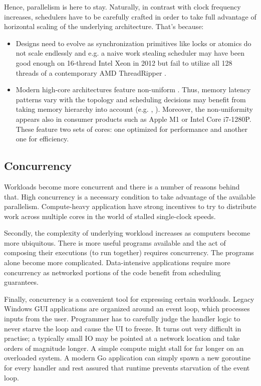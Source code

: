 \documentclass[12pt,a4paper,twoside]{report}
\begin{document}
Hence, parallelism is here to stay. Naturally, in contrast with clock frequency increases, schedulers have to be carefully crafted in order to take full advantage of horizontal scaling of the underlying architecture. That's because:
\begin{itemize}
    \item Designs need to evolve as synchronization primitives like locks or atomics do not scale endlessly and e.g. a naive work stealing scheduler may have been good enough on 16-thread Intel Xeon in 2012 but fail to utilize all 128 threads of a contemporary AMD ThreadRipper  \cite{Castello2016}. 
    \item Modern high-core architectures feature non-uniform . Thus, memory latency patterns vary with the topology and scheduling decisions may benefit from taking memory hierarchy into account (e.g. \cite{Drebes2016}, \cite{faverge:inria-00416502}). Moreover, the non-uniformity appears also in consumer products such as Apple M1 or Intel Core i7-1280P. These feature two sets of cores: one optimized for performance and another one for efficiency.
\end{itemize}

\subsection{Concurrency}
\label{section:intr_software_conc}
Workloads become more concurrent and there is a number of reasons behind that. High concurrency is a necessary condition to take advantage of the available parallelism. Compute-heavy application have strong incentives to try to distribute work across multiple cores in the world of stalled single-clock speeds. 

Secondly, the complexity of underlying workload increases as computers become more ubiquitous. There is more useful programs available and the act of composing their executions (to run together) requires concurrency. The programs alone become more complicated. Data-intensive applications \cite{Kleppmann2017-en} require more concurrency as networked portions of the code benefit from scheduling guarantees. 

Finally, concurrency is a convenient tool for expressing certain workloads. Legacy Windows GUI applications are organized around an event loop, which processes inputs from the user. Programmer has to carefully judge the handler logic to never starve the loop and cause the UI to freeze. It turns out very difficult in practise; a typically small IO may be pointed at a network location and take orders of magnitude longer. A simple compute might stall for far longer on an overloaded system. A modern Go application can simply spawn a new goroutine for every handler and rest assured that runtime prevents starvation of the event loop.  
\end{document}
